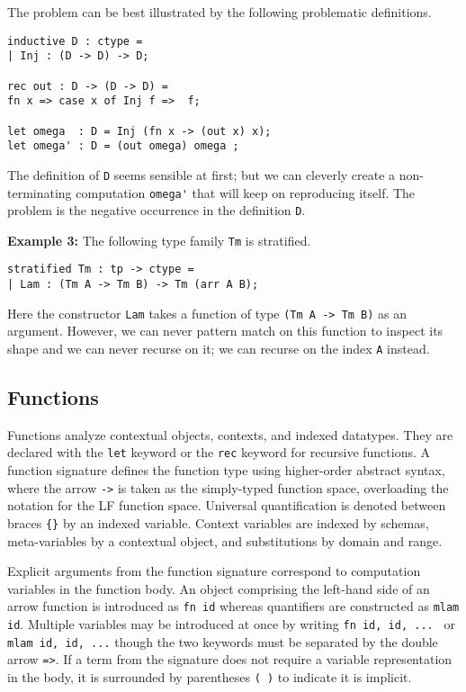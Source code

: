 \documentclass[11pt]{article}
\begin{document}
The problem can be best illustrated by  the following problematic definitions.

\begin{verbatim}
inductive D : ctype =
| Inj : (D -> D) -> D;

rec out : D -> (D -> D) =
fn x => case x of Inj f =>  f;

let omega  : D = Inj (fn x -> (out x) x);
let omega' : D = (out omega) omega ;
\end{verbatim}

The definition of \verb+D+ seems sensible at first; but we can
cleverly create a non-terminating computation \verb+omega'+ that
will keep on reproducing itself. The problem is the negative occurrence
in the definition \verb+D+.


\textbf{Example 3:} The following type family \texttt{Tm} is stratified.
\begin{verbatim}
stratified Tm : tp -> ctype =
| Lam : (Tm A -> Tm B) -> Tm (arr A B);
\end{verbatim}

Here the constructor \verb+Lam+ takes a function of type
\verb+(Tm A -> Tm B)+ as an argument. However, we can never
pattern match on this function to inspect its shape and we can never
recurse on it; we can recurse on the index \lstinline!A! instead.


\subsection{Functions}
Functions analyze contextual objects, contexts, and indexed datatypes. They are declared with the \texttt{let} keyword or the \texttt{rec} keyword for recursive functions. A function signature defines the function type using higher-order abstract syntax, where the arrow \texttt{->} is taken as the simply-typed function space, overloading the notation for the LF function space. Universal quantification is denoted between braces \texttt{\{\}} by an indexed variable. Context variables are indexed by schemas, meta-variables by a contextual object, and substitutions by domain and range.

Explicit arguments from the function signature correspond to computation variables in the function body. An object comprising the left-hand side of an arrow function is introduced as \texttt{fn id} whereas quantifiers are constructed as \texttt{mlam id}. Multiple variables may be introduced at once by writing \texttt{fn id, id, ... } or \texttt{mlam id, id, ...} though the two keywords must be separated by the double arrow \texttt{=>}. If a term from the signature does not require a variable representation in the body, it is surrounded by parentheses \texttt{( )} to indicate it is implicit. \\
\end{document}
